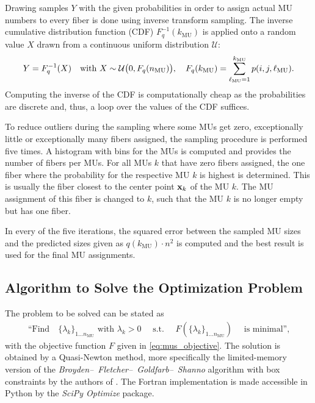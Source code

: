 Drawing samples $Y$ with the given probabilities in order to assign actual MU numbers to every fiber is done using inverse transform sampling. The inverse cumulative distribution function (CDF) $F_q^{-1}(k_\text{MU})$ is applied onto a random value $X$ drawn from a continuous uniform distribution $\mathcal{U}$:
\begin{align*}
  Y = F_q^{-1}(X)\quad \text{with }X\sim \mathcal{U}\big(0,F_q(n_\text{MU})\big), \quad F_q(k_\text{MU}) = \displaystyle\sum\limits_{\ell_\text{MU}=1}^{k_\text{MU}} p(i,j,\ell_\text{MU}).
\end{align*}
Computing the inverse of the CDF is computationally cheap as the probabilities are discrete and, thus, a loop over the values of the CDF suffices.

To reduce outliers during the sampling where some MUs get zero, exceptionally little or exceptionally many fibers assigned, the sampling procedure is performed five times.
A histogram with bins for the MUs is computed and provides the number of fibers per MUs. For all MUs $k$ that have zero fibers assigned, the one fiber where the probability for the respective MU $k$ is highest is determined. This is usually the fiber closest to the center point $\textbf{x}_k$ of the MU $k$. The MU assignment of this fiber is changed to $k$, such that the MU $k$ is no longer empty but has one fiber.

In every of the five iterations, the squared error between the sampled MU sizes and the predicted sizes given as $q(k_\text{MU})\cdot n^2$ is computed and the best result is used for the final MU assignments.

\subsection{Algorithm to Solve the Optimization Problem}
The problem to be solved can be stated as %
\begin{align*}
  \text{``Find}\quad \{\lambda_k\}_{1\dots n_\text{MU}} \text{ with } \lambda_k > 0 \quad \text{ s.t. } \quad F(\{\lambda_k\}_{1\dots n_\text{MU}}) \quad \text{ is minimal'',}
\end{align*}
with the objective function $F$ given in \cref{eq:mus_objective}. The solution is obtained by a Quasi-Newton method, more specifically the limited-memory version of the \emph{Broyden–}~\emph{Fletcher–}~\emph{Goldfarb–}~\emph{Shanno} algorithm with box constraints by the authors of \cite{byrd1995limited}. The Fortran implementation is made accessible in Python by the \emph{SciPy Optimize} package.

